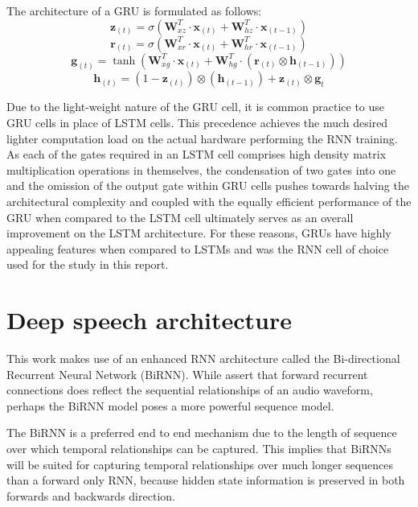 The architecture of a GRU is formulated as follows:
\begin{equation}
\mathbf{z}_{(t)}=\sigma(\mathbf{W}_{xz}^T\cdot\mathbf{x}_{(t)}+\mathbf{W}_{hz}^T\cdot\mathbf{x}_{(t-1)})\label{eqn_c3_gru01}
\end{equation}
\begin{equation}
\mathbf{r}_{(t)}=\sigma(\mathbf{W}_{xr}^T\cdot\mathbf{x}_{(t)}+\mathbf{W}_{hr}^T\cdot\mathbf{x}_{(t-1)})\label{eqn_c3_gru01}
\end{equation}\begin{equation}
\mathbf{g}_{(t)}=\tanh(\mathbf{W}_{xg}^T\cdot\mathbf{x}_{(t)}+\mathbf{W}_{hg}^T\cdot(\mathbf{r}_{(t)}\otimes\mathbf{h}_{(t-1)}))\label{eqn_c3_gru01}
\end{equation}\begin{equation}
\mathbf{h}_{(t)}=(1-\mathbf{z}_{(t)})\otimes(\mathbf{h}_{(t-1)})+\mathbf{z}_{(t)}\otimes\mathbf{g}_{t}\label{eqn_c3_gru01}
\end{equation}

Due to the light-weight nature of the GRU cell, it is common practice to use GRU cells in place of LSTM cells.  This precedence achieves the much desired lighter computation load on the actual hardware performing the RNN training. As each of the gates required in an LSTM cell comprises high density matrix multiplication operations in themselves, the condensation of two gates into one and the omission of the output gate within GRU cells pushes towards halving the architectural complexity and coupled with the equally efficient performance of the GRU when compared to the LSTM cell ultimately serves as an overall improvement on the LSTM architecture.  For these reasons, GRUs have highly appealing features when compared to LSTMs and was the RNN cell of choice used for the study in this report.

\section{Deep speech architecture}\label{deepspeech}

This work makes use of an enhanced RNN architecture called the Bi-directional Recurrent Neural Network (BiRNN). While \cite{hannun2014first} assert that forward recurrent connections does reflect the sequential relationships of an audio waveform, perhaps the BiRNN model poses a more powerful sequence model.

The BiRNN is a preferred end to end mechanism due to the length of sequence over which temporal relationships can be captured.  This implies that BiRNNs will be suited for capturing temporal relationships over much longer sequences than a forward only RNN, because hidden state information is preserved in both forwards and backwards direction. 

